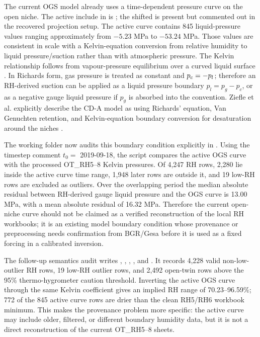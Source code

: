 The current OGS model already uses a time-dependent pressure curve on the open niche.
The active include in  is
; the shifted
 is present but commented out in the
recovered projection setup.  The active curve contains 845 liquid-pressure values
ranging approximately from \(-5.23\) MPa to \(-53.24\) MPa.  Those values are
consistent in scale with a Kelvin-equation conversion from relative humidity to liquid
pressure/suction rather than with atmospheric pressure.  The Kelvin
relationship follows from vapour-pressure equilibrium over a curved liquid surface
\cite[pp.~448--452]{Thomson1871Kelvin}.  In Richards form, gas pressure is treated as
constant and \(p_c=-p_l\); therefore an RH-derived suction can be applied as a liquid
pressure boundary \(p_l=p_g-p_c\), or as a negative gauge liquid pressure if \(p_g\) is
absorbed into the convention.  Ziefle et al. explicitly describe the CD-A model as
using Richards' equation, Van Genuchten retention, and Kelvin-equation boundary
conversion for desaturation around the niches \cite[pp.~4447--4448]{WaterContentEDZ2024}.

The working folder now audits this boundary condition explicitly in
.  Using the timestep
comment \(t_0=\) 2019-09-18, the script compares the active OGS curve with the
processed OT\_RH5--8 Kelvin pressures.  Of 4,247 RH rows, 2,280 lie inside the active
curve time range, 1,948 later rows are outside it, and 19 low-RH rows are excluded as
outliers.  Over the overlapping period the median absolute residual between
RH-derived gauge liquid pressure and the OGS curve is 13.00 MPa, with a mean absolute
residual of 16.32 MPa.  Therefore the current open-niche curve should not be claimed
as a verified reconstruction of the local RH workbooks; it is an existing model
boundary condition whose provenance or preprocessing needs confirmation from BGR/Gesa
before it is used as a fixed forcing in a calibrated inversion.

The follow-up semantics audit  writes
,
,
,
, and
.  It records 4,228 valid non-low-outlier RH rows,
19 low-RH outlier rows, and 2,492 open-twin rows above the 95\% thermo-hygrometer
caution threshold.  Inverting the active OGS curve through the same Kelvin coefficient
gives an implied RH range of 70.23--96.59\%; 772 of the 845 active curve rows are
drier than the clean RH5/RH6 workbook minimum.  This makes the provenance problem more
specific: the active curve may include older, filtered, or different boundary
humidity data, but it is not a direct reconstruction of the current OT\_RH5--8 sheets.

